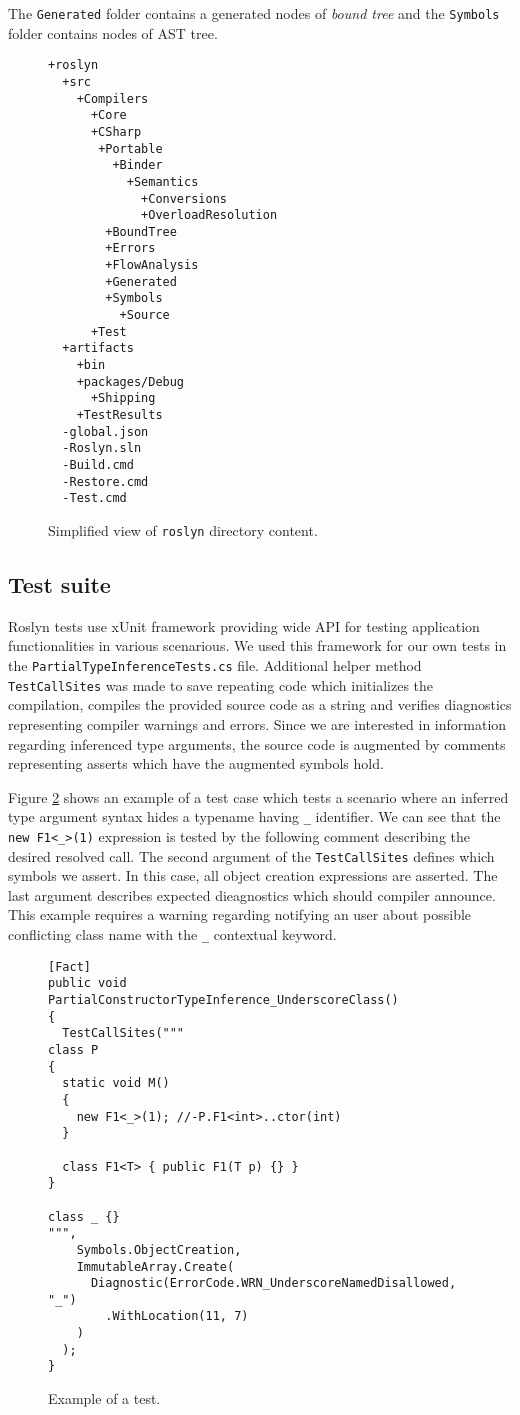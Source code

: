 The \texttt{Generated} folder contains a generated nodes of \textit{bound tree} and the \texttt{Symbols} folder contains nodes of \ac{AST} tree.
\begin{figure}[h]
\begin{lstlisting}
+roslyn
  +src
    +Compilers
      +Core
      +CSharp
       +Portable
         +Binder
           +Semantics
             +Conversions
             +OverloadResolution
        +BoundTree
        +Errors
        +FlowAnalysis
        +Generated
        +Symbols
          +Source
      +Test
  +artifacts
    +bin
    +packages/Debug
      +Shipping
    +TestResults
  -global.json
  -Roslyn.sln
  -Build.cmd
  -Restore.cmd
  -Test.cmd
\end{lstlisting}
\caption{Simplified view of \texttt{roslyn} directory content.}
\label{img68:roslynFolder}
\end{figure}

\subsection{Test suite}

Roslyn tests use xUnit framework \cite{online:xUnit} providing wide API for testing application functionalities in various scenarious.
We used this framework for our own tests in the \texttt{PartialTypeInferenceTests.cs} file.
Additional helper method \texttt{TestCallSites} was made to save repeating code which initializes the compilation, compiles the provided source code as a string and verifies diagnostics representing compiler warnings and errors.
Since we are interested in information regarding inferenced type arguments, the source code is augmented by comments representing asserts which have the augmented symbols hold.
\par
Figure \ref{img69:test} shows an example of a test case which tests a scenario where an inferred type argument syntax hides a typename having \texttt{\_} identifier.
We can see that the \texttt{new F1<\_>(1)} expression is tested by the following comment describing the desired resolved call.
The second argument of the \texttt{TestCallSites} defines which symbols we assert.
In this case, all object creation expressions are asserted.
The last argument describes expected dieagnostics which should compiler announce.
This example requires a warning regarding notifying an user about possible conflicting class name with the \texttt{\_} contextual keyword.
\begin{figure}[h]
\begin{lstlisting}[style=csharp, showstringspaces=false]
[Fact]
public void PartialConstructorTypeInference_UnderscoreClass()
{
  TestCallSites("""
class P
{
  static void M() 
  {
    new F1<_>(1); //-P.F1<int>..ctor(int)
  }

  class F1<T> { public F1(T p) {} }
}

class _ {}
""",
    Symbols.ObjectCreation,
    ImmutableArray.Create(
      Diagnostic(ErrorCode.WRN_UnderscoreNamedDisallowed, "_")
        .WithLocation(11, 7)
    )
  );
}
\end{lstlisting}
\caption{Example of a test.}
\label{img69:test}
\end{figure}


